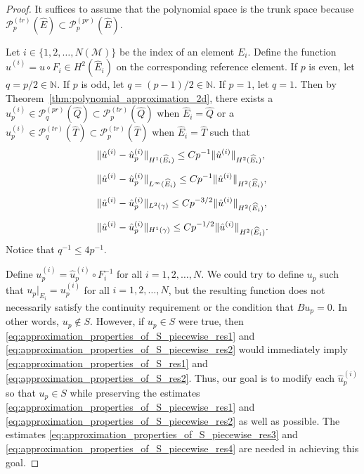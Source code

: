 \documentclass[english, 12pt, a4paper, sci, utf8, a-2b, online]{aaltothesis}
\theoremstyle{definition}
\theoremstyle{plain}
\DeclarePairedDelimiter\norm{\lVert}{\rVert}
\numberwithin{equation}{section}
\begin{document}
\begin{proof}
    It suffices to assume that the polynomial space is the trunk space because
    $\mathcal{P}_p^{(tr)}(\widehat{E}) \subset \mathcal{P}_p^{(pr)}(\widehat{E})$.

    Let $i \in \{ 1,2,\dotsc,N(\mathcal{M}) \}$ be the index of an element $E_i$.
    Define the function $\hat{u}^{(i)} = u \circ F_i \in H^2(\widehat{E}_i)$
    on the corresponding reference element.
    If $p$ is even, let $q = p/2 \in \mathbb{N}$.
    If $p$ is odd, let $q = (p-1)/2 \in \mathbb{N}$.
    If $p=1$, let $q=1$.
    Then by Theorem~\ref{thm:polynomial_approximation_2d},
    there exists a $\hat{u}_p^{(i)} \in \mathcal{P}_q^{(pr)}(\widehat{Q})
    \subset \mathcal{P}_p^{(tr)}(\widehat{Q})$ when $\widehat{E}_i = \widehat{Q}$
    or a $\hat{u}_p^{(i)} \in \mathcal{P}_q^{(tr)}(\widehat{T})
    \subset \mathcal{P}_p^{(tr)}(\widehat{T})$ when $\widehat{E}_i = \widehat{T}$
    such that
    \begin{align}
        \label{eq:approximation_properties_of_S_piecewise_res1}
        &\norm{\hat{u}^{(i)}-\hat{u}_p^{(i)}}_{H^1(\widehat{E}_i)}
        \leq C p^{-1} \norm{\hat{u}^{(i)}}_{H^2(\widehat{E}_i)}, \\[0.5em]
        \label{eq:approximation_properties_of_S_piecewise_res2}
        &\norm{\hat{u}^{(i)}-\hat{u}_p^{(i)}}_{L^{\infty}(\widehat{E}_i)}
        \leq C p^{-1} \norm{\hat{u}^{(i)}}_{H^2(\widehat{E}_i)}, \\[0.5em]
        \label{eq:approximation_properties_of_S_piecewise_res3}
        &\norm{\hat{u}^{(i)}-\hat{u}_p^{(i)}}_{L^2(\gamma)}
        \leq C p^{-3/2} \norm{\hat{u}^{(i)}}_{H^2(\widehat{E}_i)}, \\[0.5em]
        \label{eq:approximation_properties_of_S_piecewise_res4}
        &\norm{\hat{u}^{(i)}-\hat{u}_p^{(i)}}_{H^1(\gamma)}
        \leq C p^{-1/2} \norm{\hat{u}^{(i)}}_{H^2(\widehat{E}_i)}.
    \end{align}
    Notice that $q^{-1} \leq 4p^{-1}$.

    Define $u_p^{(i)} = \hat{u}_p^{(i)} \circ F_i^{-1}$ for all $i=1,2,\dotsc,N$.
    We could try to define $u_p$ such that $u_p|_{E_i} = u_p^{(i)}$
    for all $i=1,2,\dotsc,N$, but the resulting function does not necessarily
    satisfy the continuity requirement or the condition that $Bu_p = 0$.
    In other words, $u_p \notin S$. However, if $u_p \in S$ were true,
    then \eqref{eq:approximation_properties_of_S_piecewise_res1}
    and \eqref{eq:approximation_properties_of_S_piecewise_res2} would
    immediately imply \eqref{eq:approximation_properties_of_S_res1}
    and \eqref{eq:approximation_properties_of_S_res2}.
    Thus, our goal is to modify each $\hat{u}_p^{(i)}$ so that $u_p \in S$
    while preserving the estimates
    \eqref{eq:approximation_properties_of_S_piecewise_res1}
    and \eqref{eq:approximation_properties_of_S_piecewise_res2}
    as well as possible.
    The estimates \eqref{eq:approximation_properties_of_S_piecewise_res3}
    and \eqref{eq:approximation_properties_of_S_piecewise_res4}
    are needed in achieving this goal.


\end{proof}
\end{document}
